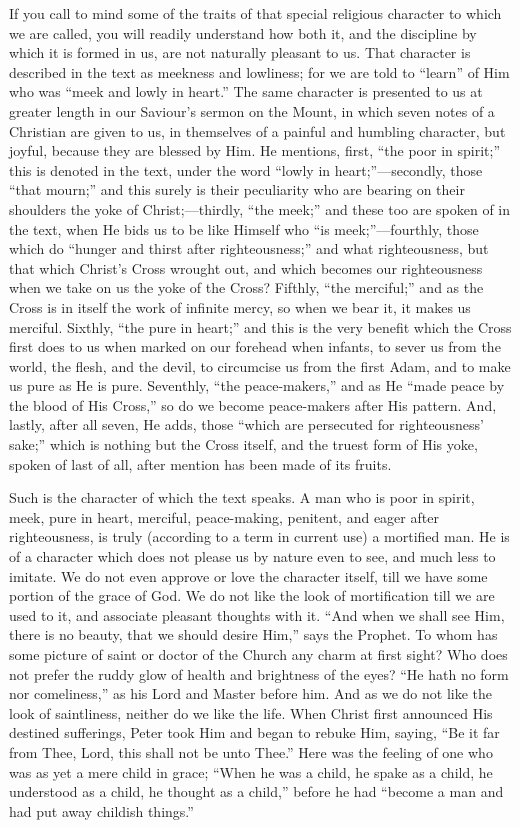 If you call to mind some of the traits of that special religious
character to which we are called, you will readily understand how both
it, and the discipline by which it is formed in us, are not naturally
pleasant to us. That character is described in the text as meekness
and lowliness; for we are told to ``learn'' of Him who was
``meek and lowly in heart.'' The same character is presented
to us at greater length in our Saviour's sermon on the Mount, in which
seven notes of a Christian are given to us, in themselves of a painful
and humbling character, but joyful, because they are blessed by Him.
He mentions, first, ``the poor in spirit;'' this is denoted in
the text, under the word ``lowly in heart;''—secondly, those
``that mourn;'' and this surely is their peculiarity who are
bearing on their shoulders the yoke of Christ;—thirdly, ``the
meek;'' and these too are spoken of in the text, when He bids us
to be like Himself who ``is meek;''—fourthly, those which do
``hunger and thirst after righteousness;'' and what
righteousness, but that which Christ's Cross wrought out, and which
becomes our righteousness when we take on us the yoke of the Cross?
Fifthly, ``the merciful;'' and as the Cross is in itself the
work of infinite mercy, so when we bear it, it makes us merciful.
Sixthly, ``the pure in heart;'' and this is the very benefit
which the Cross first does to us when marked on our forehead when
infants, to sever us from the world, the flesh, and the devil, to
circumcise us from the first Adam, and to make us pure as He is pure.
Seventhly, ``the peace-makers,'' and as He ``made peace by
the blood of His Cross,'' so do we become peace-makers after His
pattern. And, lastly, after all seven, He adds, those ``which are
persecuted for righteousness' sake;'' which is nothing but the
Cross itself, and the truest form of His yoke, spoken of last of all,
after mention has been made of its fruits.

Such is the character of which the text speaks. A man who is poor
in spirit, meek, pure in heart, merciful, peace-making, penitent, and
eager after righteousness, is truly (according to a term in current
use) a mortified man. He is of a character which does not please us by
nature even to see, and much less to imitate. We do not even approve
or love the character itself, till we have some portion of the grace
of God. We do not like the look of mortification till we are used to
it, and associate pleasant thoughts with it. ``And when we shall
see Him, there is no beauty, that we should desire Him,'' says the
Prophet. To whom has some picture of saint or doctor of the Church any
charm at first sight? Who does not prefer the ruddy glow of health and
brightness of the eyes? ``He hath no form nor comeliness,'' as
his Lord and Master before him. And as we do not like the look of
saintliness, neither do we like the life. When Christ first announced
His destined sufferings, Peter took Him and began to rebuke Him,
saying, ``Be it far from Thee, Lord, this shall not be unto
Thee.'' Here was the feeling of one who was as yet a mere child in
grace; ``When he was a child, he spake as a child, he understood
as a child, he thought as a child,'' before he had ``become a
man and had put away childish things.''

